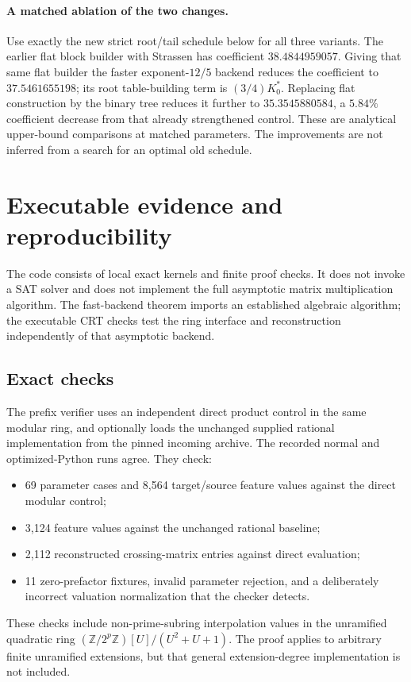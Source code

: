 \documentclass[11pt,letterpaper]{article}
\theoremstyle{definition}\newtheorem{definition}[theorem]{Definition}
\theoremstyle{remark}\newtheorem{remark}[theorem]{Remark}
\begin{document}
\paragraph{A matched ablation of the two changes.}
Use exactly the new strict root/tail schedule below for all three variants. The earlier
flat block builder with Strassen has coefficient $38.4844959057$. Giving that same flat
builder the faster exponent-$12/5$ backend reduces the coefficient to $37.5461655198$;
its root table-building term is $(3/4)K_0^*$. Replacing flat construction by the binary
tree reduces it further to $35.3545880584$, a $5.84\%$ coefficient decrease from that
already strengthened control. These are analytical upper-bound comparisons at matched
parameters. The improvements are not inferred from a search for an optimal old schedule.






\section{Executable evidence and reproducibility}
\label{sec:evidence}
The code consists of local exact kernels and finite proof checks. It does not invoke a
SAT solver and does not implement the full asymptotic matrix multiplication algorithm.
The fast-backend theorem imports an established algebraic algorithm; the executable CRT
checks test the ring interface and reconstruction independently of that asymptotic backend.

\subsection{Exact checks}
The prefix verifier uses an independent direct product control in the same modular ring,
and optionally loads the unchanged supplied rational implementation from the pinned
incoming archive. The recorded normal and optimized-Python runs agree. They check:
\begin{itemize}[leftmargin=1.5em]
\item 69 parameter cases and 8,564 target/source feature values against the direct
modular control;
\item 3,124 feature values against the unchanged rational baseline;
\item 2,112 reconstructed crossing-matrix entries against direct evaluation;
\item 11 zero-prefactor fixtures, invalid parameter rejection, and a deliberately
incorrect valuation normalization that the checker detects.
\end{itemize}
These checks include non-prime-subring interpolation values in the unramified quadratic
ring $(\mathbb Z/2^p\mathbb Z)[U]/(U^2+U+1)$. The proof applies to arbitrary finite
unramified extensions, but that general extension-degree implementation is not included.
\end{document}
